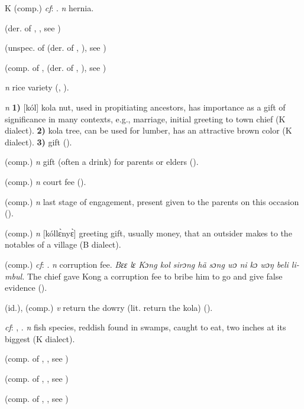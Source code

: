 \begin{letter}{K}
 (comp.) \textit{cf}: . \textit{n} hernia.

 (der. of , , see ) 

 (unspec. of  (der. of , ), see ) 

 (comp. of ,  (der. of , ), see ) 

 \textit{n} rice variety (\citealt{Pichl1967}, \citealt{Sumner1921}). 

 \textit{n} \textbf{1)} [kól] kola nut, used in propitiating ancestors, has importance as a gift of significance in many contexts, e.g., marriage, initial greeting to town chief (K dialect). \textbf{2)} kola tree, can be used for lumber, has an attractive brown color (K dialect). \textbf{3)} gift (\citealt{Pichl1967}). 

 (comp.) \textit{n} gift (often a drink) for parents or elders (\citealt{Pichl1967}). 

 (comp.) \textit{n} court fee (\citealt{Pichl1967}). 

 (comp.) \textit{n} last stage of engagement, present given to the parents on this occasion (\citealt{Pichl1967}). 

 (comp.) \textit{n} [kóllɛ̀nyɛ̀] greeting gift, usually money, that an outsider makes to the notables of a village (B dialect). 

 (comp.) \textit{cf}: . \textit{n} corruption fee. \textit{Bɛɛ lɛ Kɔng kol sirɔng hã sɔng wɔ ni kɔ wɔŋ beli li-mbul.} The chief gave Kong a corruption fee to bribe him to go and give false evidence (\citealt{Pichl1967}). 

 (id.), (comp.) \textit{v} return the dowry (lit. return the kola) (\citealt{Pichl1967}). 

 \textit{cf}: , . \textit{n} fish species, reddish found in swamps, caught to eat, two inches at its biggest (K dialect).

 (comp. of , , see ) 

 (comp. of , , see ) 

 (comp. of , , see ) 


\end{letter}
